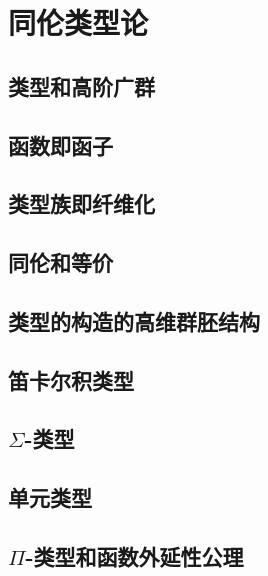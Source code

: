 \chapter{同伦类型论}
\label{cha:basics}


\section{类型和高阶广群}
\label{sec:equality}


\section{函数即函子}
\label{sec:functors}


\section{类型族即纤维化}
\label{sec:fibrations}


\section{同伦和等价}
\label{sec:basics-equivalences}


\section{类型的构造的高维群胚结构}
\label{sec:computational}


\section{笛卡尔积类型}
\label{sec:compute-cartprod}


\section{\texorpdfstring{$\Sigma$}{Σ}-类型}
\label{sec:compute-sigma}


\section{单元类型}
\label{sec:compute-unit}


\section{\texorpdfstring{$\Pi$}{Π}-类型和函数外延性公理}
\label{sec:compute-pi}



